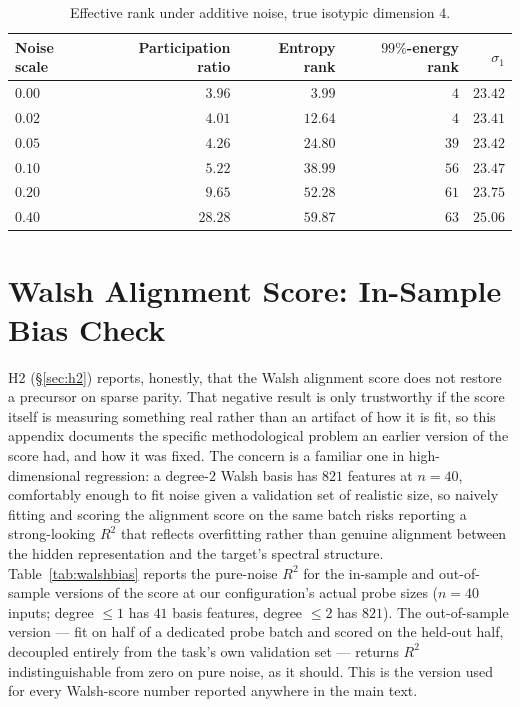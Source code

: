 \documentclass{article}
\begin{document}
\begin{table}[h]
\caption{Effective rank under additive noise, true isotypic dimension $4$.}
\label{tab:metricrobust}
\centering
\small
\begin{tabular}{@{}lrrrr@{}}
\toprule
Noise scale & Participation ratio & Entropy rank & $99\%$-energy rank & $\sigma_1$ \\
\midrule
$0.00$ & $3.96$ & $3.99$ & $4$ & $23.42$ \\
$0.02$ & $4.01$ & $12.64$ & $4$ & $23.41$ \\
$0.05$ & $4.26$ & $24.80$ & $39$ & $23.42$ \\
$0.10$ & $5.22$ & $38.99$ & $56$ & $23.47$ \\
$0.20$ & $9.65$ & $52.28$ & $61$ & $23.75$ \\
$0.40$ & $28.28$ & $59.87$ & $63$ & $25.06$ \\
\bottomrule
\end{tabular}
\end{table}

\FloatBarrier
\section{Walsh Alignment Score: In-Sample Bias Check}
\label{app:walsh_bias}

H2 (\S\ref{sec:h2}) reports, honestly, that the Walsh alignment score does
not restore a precursor on sparse parity. That negative result is only
trustworthy if the score itself is measuring something real rather than
an artifact of how it is fit, so this appendix documents the specific
methodological problem an earlier version of the score had, and how it
was fixed. The concern is a familiar one in high-dimensional regression:
a degree-$2$ Walsh basis has $821$ features at $n=40$, comfortably enough
to fit noise given a validation set of realistic size, so naively fitting
and scoring the alignment score on the same batch risks reporting a
strong-looking $R^2$ that reflects overfitting rather than genuine
alignment between the hidden representation and the target's spectral
structure. Table~\ref{tab:walshbias} reports the pure-noise $R^2$ for the
in-sample and out-of-sample versions of the score at our configuration's
actual probe sizes ($n=40$ inputs; degree $\le\!1$ has $41$ basis
features, degree $\le\!2$ has $821$). The out-of-sample version --- fit on
half of a dedicated probe batch and scored on the held-out half,
decoupled entirely from the task's own validation set --- returns
$R^2$ indistinguishable from zero on pure noise, as it should. This is
the version used for every Walsh-score number reported anywhere in the
main text.
\end{document}
